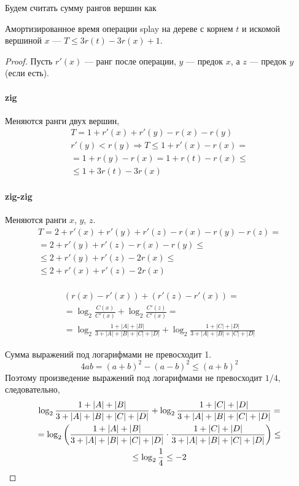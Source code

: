 Будем считать сумму рангов вершин как

\begin{theorem}
    Амортизированное время операции splay
    на дереве с корнем $t$ и искомой вершиной $x$
    --- $T \leq 3r(t) - 3r(x) + 1$.
\end{theorem}
\begin{proof}
    Пусть $r'(x)$ --- ранг после операции,
    $y$ --- предок $x$, а $z$ --- предок $y$ (если есть).

    \paragraph{zig}
    Меняются ранги двух вершин,
    \begin{gather*}
        T = 1 + r'(x) + r'(y) - r(x) - r(y) \\
        r'(y) < r(y) \Rightarrow T \leq 1 + r'(x) - r(x) = \\
        = 1 + r(y) - r(x) = 1 + r(t) - r(x) \leq \\
        \leq 1 + 3 r(t) - 3 r(x)
    \end{gather*}

    \paragraph{zig-zig}
    Меняются ранги $x$, $y$, $z$.
    \begin{gather*}
        T = 2 + r'(x) + r'(y) + r'(z) - r(x) - r(y) - r(z) = \\
        = 2 + r'(y) + r'(z) - r(x) - r(y) \leq \\
        \leq 2 + r'(y) + r'(z) - 2 r(x) \leq \\
        \leq 2 + r'(x) + r'(z) - 2 r(x) \\
    \end{gather*}

    \begin{gather*}
        (r(x) - r'(x)) + (r'(z) - r'(x)) = \\
        = \log_2 \frac{C(x)}{C'(x)} + \log_2 \frac{C'(z)}{C'(x)} = \\
        = \log_2 \frac{1 + |A| + |B|}{3 + |A| + |B| + |C| + |D|}
        + \log_2 \frac{1 + |C| + |D|}{3 + |A| + |B| + |C| + |D|}
    \end{gather*}

    Сумма выражений под логарифмами не превосходит 1.
    \[
        4ab = (a + b)^2 - (a - b)^2 \leq (a + b)^2
    \]
    Поэтому произведение выражений под логарифмами
    не превосходит $1/4$, следовательно,
    \begin{gather*}
        \log_2 \frac{1 + |A| + |B|}{3 + |A| + |B| + |C| + |D|}
        + \log_2 \frac{1 + |C| + |D|}{3 + |A| + |B| + |C| + |D|} = \\
        = \log_2 \left( 
            \frac{1 + |A| + |B|}{3 + |A| + |B| + |C| + |D|} \cdot
            \frac{1 + |C| + |D|}{3 + |A| + |B| + |C| + |D|} \right) \leq \\
        \leq \log_2 \frac{1}{4} \leq -2 \\
    \end{gather*}


\end{proof}
